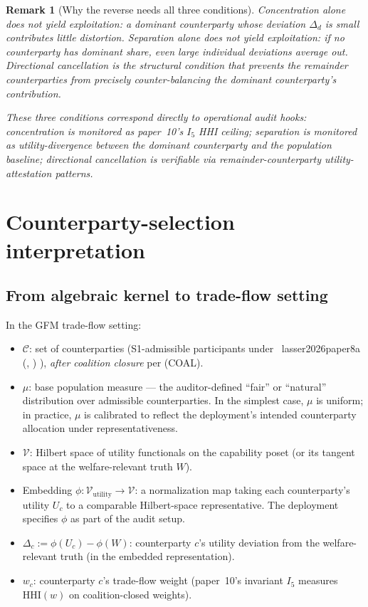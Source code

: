 \documentclass{article}
\makeatletter
\newcommand{\citep}[2][]{%
  \begingroup
  \def\@tmpkey{#2}%
  \ifx\@tmpkey\@empty\else
    (\ifx\@empty#1\@empty\else #1, \fi
     \@nameuse{bibkey@\@tmpkey})%
  \fi
  \endgroup
}
\newtheorem{remark}{Remark}
\newcommand{\HHI}{\mathrm{HHI}}
\makeatother
\begin{document}
\begin{remark}[Why the reverse needs all three conditions]
\label{rem:reverse-conditions}
Concentration alone does not yield exploitation: a dominant
counterparty whose deviation $\Delta_d$ is small contributes little
distortion.  Separation alone does not yield exploitation: if no
counterparty has dominant share, even large individual deviations
average out.  Directional cancellation is the structural condition
that prevents the remainder counterparties from precisely
counter-balancing the dominant counterparty's contribution.

These three conditions correspond directly to operational audit
hooks: concentration is monitored as paper~10's $I_5$ HHI ceiling;
separation is monitored as utility-divergence between the dominant
counterparty and the population baseline; directional cancellation
is verifiable via remainder-counterparty utility-attestation
patterns.
\end{remark}

\section{Counterparty-selection interpretation}

\subsection{From algebraic kernel to trade-flow setting}

In the GFM trade-flow setting:
\begin{itemize}
\item $\mathcal{C}$: set of counterparties (S1-admissible
  participants under~\citep{lasser2026paper8a}), \emph{after
  coalition closure} per (COAL).
\item $\mu$: base population measure --- the auditor-defined
  ``fair'' or ``natural'' distribution over admissible
  counterparties.  In the simplest case, $\mu$ is uniform; in
  practice, $\mu$ is calibrated to reflect the deployment's
  intended counterparty allocation under representativeness.
\item $\mathcal{V}$: Hilbert space of utility functionals on the
  capability poset (or its tangent space at the welfare-relevant
  truth $W$).
\item Embedding $\phi: \mathcal{V}_\mathrm{utility} \to
  \mathcal{V}$: a normalization map taking each counterparty's
  utility $U_c$ to a comparable Hilbert-space representative.
  The deployment specifies $\phi$ as part of the audit setup.
\item $\Delta_c := \phi(U_c) - \phi(W)$: counterparty $c$'s
  utility deviation from the welfare-relevant truth (in the
  embedded representation).
\item $w_c$: counterparty $c$'s trade-flow weight (paper~10's
  invariant $I_5$ measures $\HHI(w)$ on coalition-closed weights).
\end{itemize}
\end{document}
